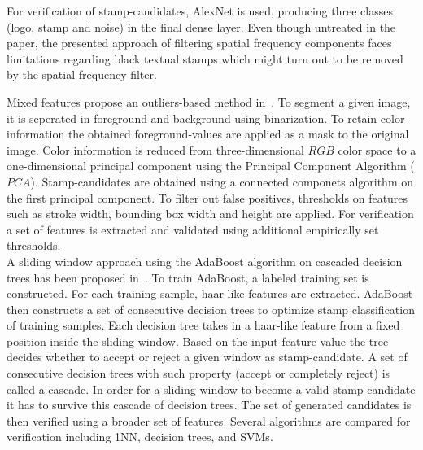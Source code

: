 \begin{description}
\begin{enumerate*}[label={\alph*)},font={\color{red!50!black}\bfseries}]
        For verification of stamp-candidates, AlexNet is used, producing three
        classes (logo, stamp and noise) in the final dense layer. Even though
        untreated in the paper, the presented approach of filtering spatial
        frequency components faces limitations regarding black textual stamps
        which might turn out to be removed by the spatial frequency filter.\\
        \item [Mixed features]
        \citeauthor*{Dey.16.12.201519.12.2015} propose an outliers-based
        method in~\cite{Dey.16.12.201519.12.2015}. To segment a given image,
        it is seperated in foreground and background using binarization. To
        retain color information the obtained foreground-values are applied as
        a mask to the original image. Color information is reduced from
        three-dimensional \(RGB\) color space to a one-dimensional principal
        component using the Principal Component Algorithm (\(PCA\)).
        Stamp-candidates are obtained using a connected componets algorithm on
        the first principal component. To filter out false positives,
        thresholds on features such as stroke width, bounding box width and
        height are applied. For verification a set of features is extracted and
        validated using additional empirically set thresholds.\\

        A sliding window approach using the AdaBoost algorithm on cascaded
        decision trees has been proposed in~\cite{Forczmanski.2016}. To train 
        AdaBoost, a labeled training set is constructed. For each training 
        sample, haar-like features are extracted. AdaBoost then constructs a 
        set of consecutive decision trees to optimize stamp classification of 
        training samples. Each decision tree takes in a haar-like feature from 
        a fixed position inside the sliding window. Based on the input feature 
        value the tree decides whether to accept or reject a given window as 
        stamp-candidate. A set of consecutive decision trees with such property 
        (accept or completely reject) is called a cascade. In order for a 
        sliding window to become a valid stamp-candidate it has to survive this 
        cascade of decision trees. The set of generated candidates is then 
        verified using a broader set of features. Several algorithms are 
        compared for verification including 1NN, decision trees, and SVMs.\\


\end{enumerate*}
\end{description}

